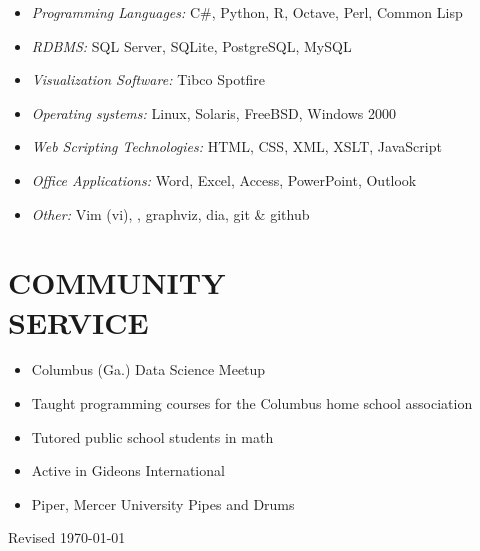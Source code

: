 \documentclass[margin, 10pt]{res} %
\begin{document}
\begin{resume}
\begin{itemize}
\item {\it Programming Languages:} C\#, Python,  \textsf{R},  Octave, Perl, Common Lisp
\item {\it RDBMS:} SQL Server, SQLite, PostgreSQL, MySQL 
\item {\it Visualization Software:} Tibco Spotfire
\item {\it Operating systems:} Linux, Solaris, FreeBSD, Windows 2000
\item {\it Web Scripting Technologies:} HTML, CSS, XML, XSLT, JavaScript
\item {\it Office Applications:} Word, Excel, Access, PowerPoint, Outlook
\item {\it Other:} Vim (vi), \LaTeXe, graphviz, dia, git \& github
\end{itemize}

 


\section{COMMUNITY \\ SERVICE}

\begin{itemize} \itemsep -2pt %
    \item Columbus (Ga.) Data Science Meetup
    \item Taught programming courses for the Columbus home school association
    \item Tutored public school students in math
    \item Active in Gideons International
    \item Piper, Mercer University Pipes and Drums
\end{itemize}

\vspace*{\fill}
\tiny{Revised \today}


\end{resume}
\end{document}
